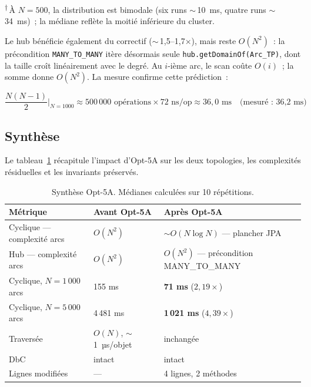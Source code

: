 \textsuperscript{$\dagger$}\,À $N=500$, la distribution est bimodale
(six runs $\sim$\,10~ms, quatre runs $\sim$\,34~ms)~; la médiane reflète
la moitié inférieure du cluster.

Le hub bénéficie également du correctif ($\sim$\,1,5--1,7$\times$), mais
reste $O(N^2)$~: la précondition \texttt{MANY\_TO\_MANY} itère désormais
seule \texttt{hub.getDomainOf(Arc\_TP)}, dont la taille croît linéairement
avec le degré. Au $i$-ième arc, le scan coûte $O(i)$~; la somme donne
$O(N^2)$. La mesure confirme cette prédiction~:

$$\frac{N(N-1)}{2}\bigg|_{N=1000} \approx 500\,000 \text{ opérations} \times 72\text{ ns/op} \approx 36{,}0\text{ ms} \quad \text{(mesuré : 36,2~ms)}$$

\subsection{Synthèse}

Le tableau~\ref{tab:sc5-synthese} récapitule l'impact d'Opt-5A sur les
deux topologies, les complexités résiduelles et les invariants préservés.

\begin{table}[h]
\centering
\caption{Synthèse Opt-5A. Médianes calculées sur 10 répétitions.}
\label{tab:sc5-synthese}
\begin{tabular}{lll}
\hline
\textbf{Métrique} & \textbf{Avant Opt-5A} & \textbf{Après Opt-5A} \\
\hline
Cyclique --- complexité arcs & $O(N^2)$ & $\sim O(N \log N)$ --- plancher JPA \\
Hub --- complexité arcs      & $O(N^2)$ & $O(N^2)$ --- précondition MANY\_TO\_MANY \\
Cyclique, $N=1\,000$ arcs    & 155 ms     & \textbf{71 ms} ($2{,}19\times$) \\
Cyclique, $N=5\,000$ arcs    & 4\,481 ms  & \textbf{1\,021 ms} ($4{,}39\times$) \\
Traversée                    & $O(N)$, $\sim$1~µs/objet & inchangée \\
DbC                          & intact     & intact \\
Lignes modifiées             & ---        & 4 lignes, 2 méthodes \\
\hline
\end{tabular}
\end{table}

